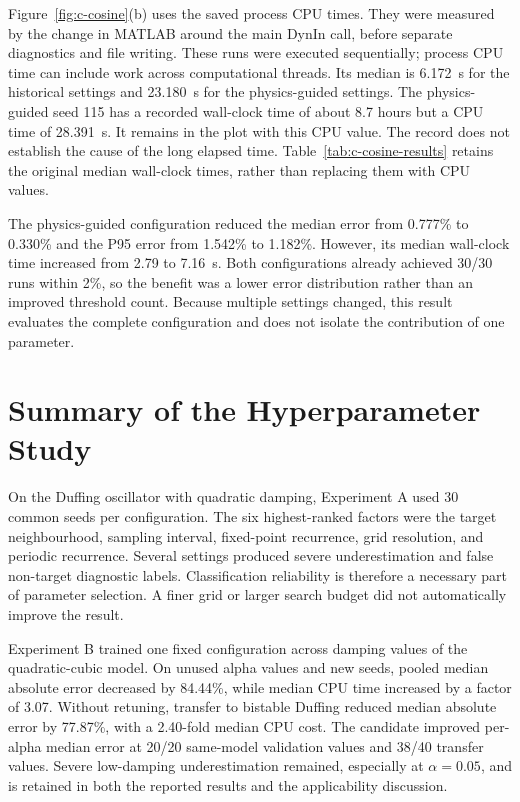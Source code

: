 \begin{revision}
Figure~\ref{fig:c-cosine}(b) uses the saved process CPU times. They were measured by the change in MATLAB  around the main DynIn call, before separate diagnostics and file writing. These runs were executed sequentially; process CPU time can include work across computational threads. Its median is 6.172~s for the historical settings and 23.180~s for the physics-guided settings. The physics-guided seed 115 has a recorded wall-clock time of about 8.7 hours but a CPU time of 28.391~s. It remains in the plot with this CPU value. The record does not establish the cause of the long elapsed time. Table~\ref{tab:c-cosine-results} retains the original median wall-clock times, rather than replacing them with CPU values.
\end{revision}

\begin{revision}
The physics-guided configuration reduced the median error from 0.777\% to 0.330\% and the P95 error from 1.542\% to 1.182\%. However, its median wall-clock time increased from 2.79 to 7.16~s. Both configurations already achieved 30/30 runs within 2\%, so the benefit was a lower error distribution rather than an improved threshold count. Because multiple settings changed, this result evaluates the complete configuration and does not isolate the contribution of one parameter.
\end{revision}

\section{Summary of the Hyperparameter Study}
\label{sec:hyperparameter-summary}

\begin{bluerevision}
On the Duffing oscillator with quadratic damping, Experiment A used 30 common seeds per configuration. The six highest-ranked factors were the target neighbourhood, sampling interval, fixed-point recurrence, grid resolution,  and periodic recurrence. Several settings produced severe underestimation and false non-target diagnostic labels. Classification reliability is therefore a necessary part of parameter selection. A finer grid or larger search budget did not automatically improve the result.

Experiment B trained one fixed configuration across damping values of the quadratic-cubic model. On unused alpha values and new seeds, pooled median absolute error decreased by 84.44\%, while median CPU time increased by a factor of 3.07. Without retuning, transfer to bistable Duffing reduced median absolute error by 77.87\%, with a 2.40-fold median CPU cost. The candidate improved per-alpha median error at 20/20 same-model validation values and 38/40 transfer values. Severe low-damping underestimation remained, especially at $\alpha=0.05$, and is retained in both the reported results and the applicability discussion.
\end{bluerevision}

